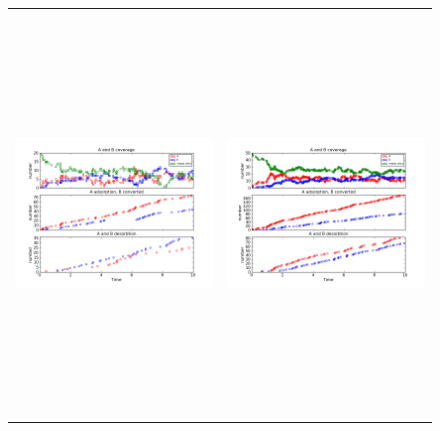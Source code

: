 \documentclass[11pt]{article}
\begin{document}
\begin{figure}[h!]
\begin{tabular}{cc}
\includegraphics[width=3.5in, height=4.2in]{./coadsorb_irreversible/AtoBirreversible2x10_301_allsamek_A5_EA5E3_3.png} &
\includegraphics[width=3.5in, height=4.2in]{./coadsorb_irreversible/AtoBirreversible5x10_301_allsamek_A5_EA5E3_3.png} \\

\end{tabular}
\end{figure}
\end{document}
